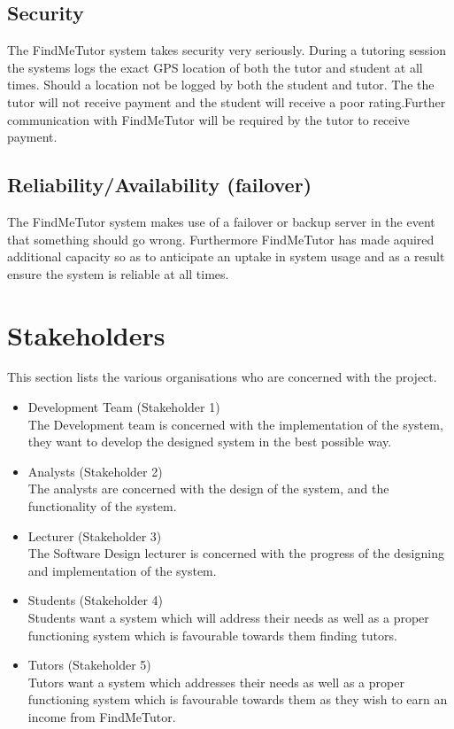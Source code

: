 \documentclass[12pt]{article}
\begin{document}
\subsection{Security}
The FindMeTutor system takes security very seriously. During a tutoring session the systems logs the exact GPS location of both the tutor and student at all times. Should a location not be logged by both the student and tutor. The the tutor will not receive payment and the student will receive a poor rating.Further communication with FindMeTutor will be required by the tutor to receive payment.

\subsection{Reliability/Availability (failover)}
The FindMeTutor system makes use of a failover or backup server in the event that something should go wrong. Furthermore FindMeTutor has made aquired additional capacity so as to anticipate an uptake in system usage and as a result ensure the system is reliable at all times.

\pagebreak

\section{Stakeholders}
This section lists the various organisations who are concerned with the project.
\begin{itemize}

\item Development Team (Stakeholder 1)\\
The Development team is concerned with the implementation of the system, they want to develop the designed system in the best possible way.

\item Analysts (Stakeholder 2)\\
The analysts are concerned with the design of the system, and the functionality of the system.

\item Lecturer (Stakeholder 3)\\
The Software Design lecturer is concerned with the progress of the designing and implementation of the system.

\item Students (Stakeholder 4)\\
Students want a system which will address their needs as well as a proper functioning system which is favourable towards them finding tutors.

\item Tutors (Stakeholder 5)\\
Tutors want a system which addresses their needs as well as a proper functioning system which is favourable towards them as they wish to earn an income from FindMeTutor.
\end{itemize}
\end{document}
